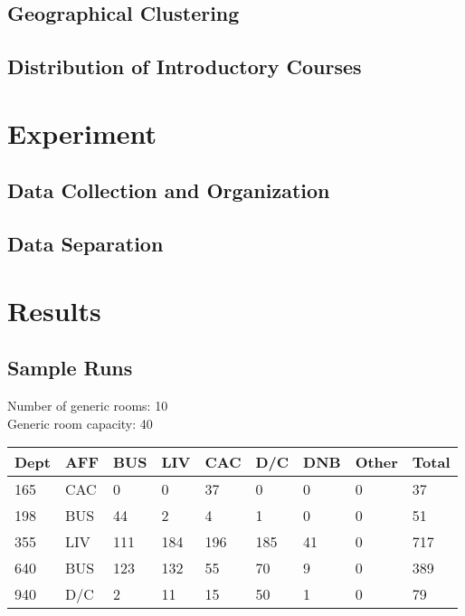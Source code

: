 \documentclass{acm_proc_article-sp}
\begin{document}
	\subsection{Geographical Clustering}

	\subsection{Distribution of Introductory Courses}

\section{Experiment}

	\subsection{Data Collection and Organization}

	\subsection{Data Separation}

\section{Results}

	\subsection{Sample Runs}
		Number of generic rooms: 10 \\
		Generic room capacity: 40
		\begin{center}
			 \label{tab:title} 
			\begin{tabular} { | l | l | l | l | l | l | l | l | l | }
				\hline
				Dept & AFF & BUS & LIV & CAC & D/C & DNB & Other & Total \\ \hline
				165 & CAC & 0 & 0 & 37 & 0 & 0 & 0 & 37 \\ \hline
				198 & BUS & 44 & 2 & 4 & 1 & 0 & 0 & 51 \\ \hline
				355 & LIV & 111 & 184 & 196 & 185 & 41 & 0 & 717 \\ \hline
				640 & BUS & 123 & 132 & 55 & 70 & 9 & 0 & 389 \\ \hline
				940 & D/C & 2 & 11 & 15 & 50 & 1 & 0 & 79 \\ \hline
			\end{tabular}
		\end{center}
\end{document}
